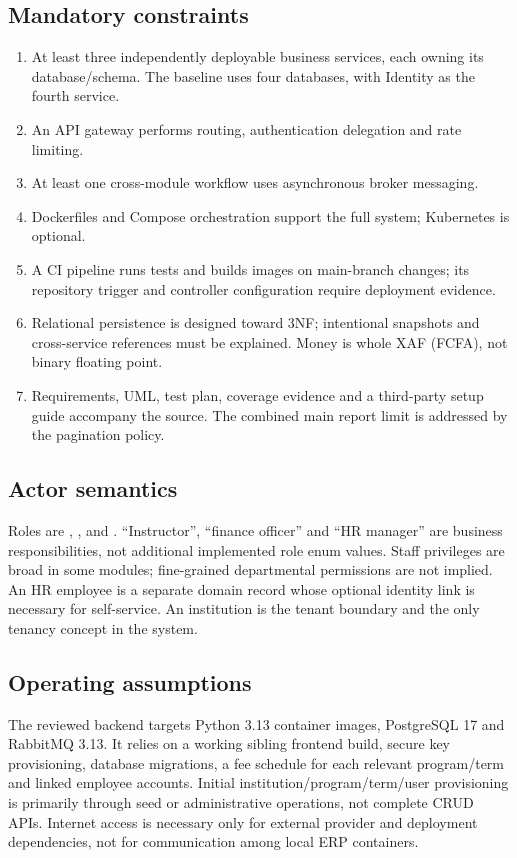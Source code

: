 \documentclass[10pt,a4paper]{article}
\begin{document}
\subsection{Mandatory constraints}
\begin{enumerate}
\item At least three independently deployable business services, each owning its
database/schema. The baseline uses four databases, with Identity as the fourth service.
\item An API gateway performs routing, authentication delegation and rate limiting.
\item At least one cross-module workflow uses asynchronous broker messaging.
\item Dockerfiles and Compose orchestration support the full system; Kubernetes is optional.
\item A CI pipeline runs tests and builds images on main-branch changes; its repository
trigger and controller configuration require deployment evidence.
\item Relational persistence is designed toward 3NF; intentional snapshots and cross-service
references must be explained. Money is whole XAF (FCFA), not binary floating point.
\item Requirements, UML, test plan, coverage evidence and a third-party setup guide accompany
the source. The combined main report limit is addressed by the pagination policy.
\end{enumerate}
\subsection{Actor semantics}
Roles are , ,  and .
``Instructor'', ``finance officer'' and ``HR manager'' are business responsibilities,
not additional implemented role enum values. Staff privileges are broad in some
modules; fine-grained departmental permissions are not implied. An HR employee is a
separate domain record whose optional identity link is necessary for self-service.
An institution is the tenant boundary and the only tenancy concept in the system.

\subsection{Operating assumptions}
The reviewed backend targets Python 3.13 container images, PostgreSQL 17 and
RabbitMQ 3.13. It relies on a working sibling frontend build, secure key provisioning,
database migrations, a fee schedule for each relevant program/term and linked
employee accounts. Initial institution/program/term/user provisioning is primarily
through seed or administrative operations, not complete CRUD APIs.
Internet access is necessary only for external provider and deployment dependencies,
not for communication among local ERP containers.
\end{document}

